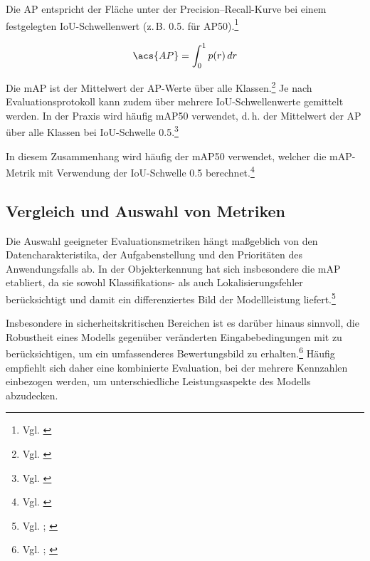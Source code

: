 Die \ac{AP} entspricht der Fläche unter der Precision–Recall-Kurve bei einem festgelegten \ac{IoU}-Schwellenwert (z.\,B. 0.5. für \ac{AP}50).\footnote{Vgl. \cite[13]{zaripov_creation_2025}}

\[
\acs{AP} = \int_0^1 p(r) \, dr
\]

Die \ac{mAP} ist der Mittelwert der \ac{AP}-Werte über alle Klassen.\footnote{Vgl. \cite[14]{zaripov_creation_2025}} Je nach Evaluationsprotokoll kann zudem über mehrere \ac{IoU}-Schwellenwerte gemittelt werden. In der Praxis wird häufig \ac{mAP}50 verwendet, d.\,h. der Mittelwert der \ac{AP} über alle Klassen bei \ac{IoU}-Schwelle 0.5.\footnote{Vgl. \cite[S. 13 f.]{zaripov_creation_2025}}

In diesem Zusammenhang wird häufig der \ac{mAP}50 verwendet, welcher die \ac{mAP}-Metrik mit Verwendung der \ac{IoU}-Schwelle 0.5 berechnet.\footnote{Vgl. \cite[S. 13]{zaripov_creation_2025}}


\subsection{Vergleich und Auswahl von Metriken}

Die Auswahl geeigneter Evaluationsmetriken hängt maßgeblich von den Datencharakteristika, der Aufgabenstellung und den Prioritäten des Anwendungsfalls ab. In der Objekterkennung hat sich insbesondere die \ac{mAP} etabliert, da sie sowohl Klassifikations- als auch Lokalisierungsfehler berücksichtigt und damit ein differenziertes Bild der Modellleistung liefert.\footnote{Vgl. \cite[S. 65240]{arslanoglu_vision_2025}; \cite[S. 94272]{khanam_comprehensive_2024}}

Insbesondere in sicherheitskritischen Bereichen ist es darüber hinaus sinnvoll, die Robustheit eines Modells gegenüber veränderten Eingabebedingungen mit zu berücksichtigen, um ein umfassenderes Bewertungsbild zu erhalten.\footnote{Vgl. \cite[S. 65234]{arslanoglu_vision_2025}; \cite[S. 105282]{ali_adversarial_2024}} Häufig empfiehlt sich daher eine kombinierte Evaluation, bei der mehrere Kennzahlen einbezogen werden, um unterschiedliche Leistungsaspekte des Modells abzudecken.
